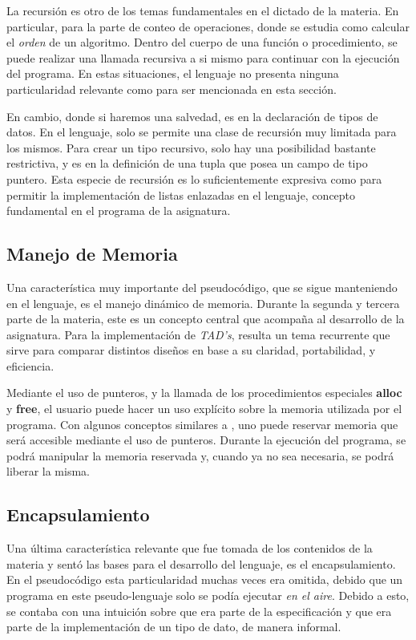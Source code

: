 La recursión es otro de los temas fundamentales en el dictado de la materia.
En particular, para la parte de conteo de operaciones, donde se estudia como calcular el \textit{orden} de un algoritmo.
Dentro del cuerpo de una función o procedimiento, se puede realizar una llamada recursiva a si mismo para continuar con la ejecución del programa.
En estas situaciones, el lenguaje no presenta ninguna particularidad relevante como para ser mencionada en esta sección.

En cambio, donde si haremos una salvedad, es en la declaración de tipos de datos.
En el lenguaje, solo se permite una clase de recursión muy limitada para los mismos.
Para crear un tipo recursivo, solo hay una posibilidad bastante restrictiva, y es en la definición de una tupla que posea un campo de tipo puntero.
Esta especie de recursión es lo suficientemente expresiva como para permitir la implementación de listas enlazadas en el lenguaje, concepto fundamental en el programa de la asignatura.

\subsection{Manejo de Memoria}

Una característica muy importante del pseudocódigo, que se sigue manteniendo en el lenguaje, es el manejo dinámico de memoria.
Durante la segunda y tercera parte de la materia, este es un concepto central que acompaña al desarrollo de la asignatura.
Para la implementación de \textit{TAD's}, resulta un tema recurrente que sirve para comparar distintos diseños en base a su claridad, portabilidad, y eficiencia.

Mediante el uso de punteros, y la llamada de los procedimientos especiales \textbf{alloc} y \textbf{free}, el usuario puede hacer un uso explícito sobre la memoria utilizada por el programa.
Con algunos conceptos similares a \C{}, uno puede reservar memoria que será accesible mediante el uso de punteros.
Durante la ejecución del programa, se podrá manipular la memoria reservada y, cuando ya no sea necesaria, se podrá liberar la misma.

\subsection{Encapsulamiento}

Una última característica relevante que fue tomada de los contenidos de la materia y sentó las bases para el desarrollo del lenguaje, es el encapsulamiento.
En el pseudocódigo esta particularidad muchas veces era omitida, debido que un programa en este pseudo-lenguaje solo se podía ejecutar \textit{en el aire}.
Debido a esto, se contaba con una intuición sobre que era parte de la especificación y que era parte de la implementación de un tipo de dato, de manera informal.

